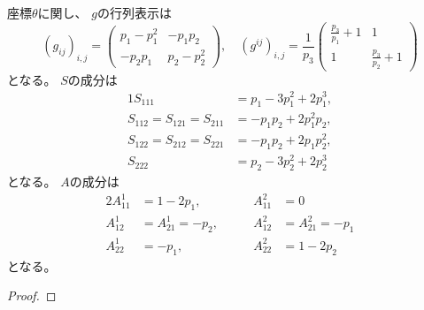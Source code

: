 \documentclass[report]{jlreq}
\begin{document}
\begin{proposition}[$n = 3$での$g, S, A$の計算]
    座標$\theta$に関し、
    $g$の行列表示は
    \begin{equation}
        (g_{ij})_{i, j}
            = \begin{pmatrix}
                p_1 - p_1^2 & - p_1 p_2 \\
                - p_2 p_1 & p_2 - p_2^2
            \end{pmatrix},
            \quad
        (g^{ij})_{i, j}
            = \frac{1}{p_3}
                \begin{pmatrix}
                    \frac{p_3}{p_1} + 1 & 1 \\
                    1 & \frac{p_3}{p_2} + 1
                \end{pmatrix}
    \end{equation}
    となる。
    $S$の成分は
    \begin{alignat}{1}
        S_{111}
            &= p_1 - 3 p_1^2 + 2 p_1^3, \\
        S_{112} = S_{121} = S_{211}
            &= - p_1 p_2 + 2 p_1^2 p_2, \\
        S_{122} = S_{212} = S_{221}
            &= - p_1 p_2 + 2 p_1 p_2^2, \\
        S_{222}
            &= p_2 - 3 p_2^2 + 2 p_2^3
    \end{alignat}
    となる。
    $A$の成分は
    \begin{alignat}{2}
        A_{11}^1
            &=
                1 - 2p_1,
                \qquad
        &A_{11}^2
            &=
                0
                \\
        A_{12}^1
            &=
                A_{21}^1
            =
                - p_2,
                \qquad
        &A_{12}^2
            &=
                A_{21}^2
            =
                - p_1
                \\
        A_{22}^1
            &=
                - p_1,
                \qquad
        &A_{22}^2
            &=
                1 - 2p_2
    \end{alignat}
    となる。
\end{proposition}

\begin{proof}
    \TODO{}
\end{proof}
\end{document}
